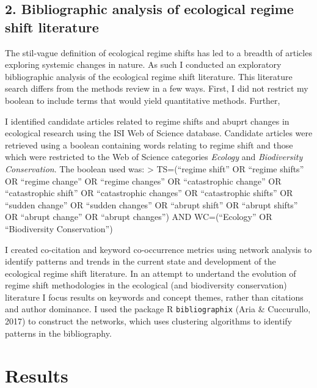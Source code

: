 \documentclass[12pt,twoside,openany]{reedthesis}
\begin{document}
\hypertarget{bibliographic-analysis-of-ecological-regime-shift-literature}{%
\subsection{2. Bibliographic analysis of ecological regime shift literature}\label{bibliographic-analysis-of-ecological-regime-shift-literature}}

The stil-vague definition of ecological regime shifts has led to a breadth of articles exploring systemic changes in nature. As such I conducted an exploratory bibliographic analysis of the ecological regime shift literature. This literature search differs from the methods review in a few ways. First, I did not restrict my boolean to include terms that would yield quantitative methods. Further,

I identified candidate articles related to regime shifts and abuprt changes in ecological research using the ISI Web of Science database. Candidate articles were retrieved using a boolean containing words relating to regime shift and those which were restricted to the Web of Science categories \emph{Ecology} and \emph{Biodiversity Conservation}. The boolean used was:
\textgreater{} TS=(``regime shift'' OR ``regime shifts'' OR ``regime change'' OR ``regime changes'' OR ``catastrophic change'' OR ``catastrophic shift'' OR ``catastrophic changes'' OR ``catastrophic shifts'' OR ``sudden change'' OR ``sudden changes'' OR ``abrupt shift'' OR ``abrupt shifts'' OR ``abrupt change'' OR ``abrupt changes'') AND WC=(``Ecology'' OR ``Biodiversity Conservation'')

I created co-citation and keyword co-occurrence metrics using network analysis to identify patterns and trends in the current state and development of the ecological regime shift literature. In an attempt to undertand the evolution of regime shift methodologies in the ecological (and biodiversity conservation) literature I focus results on keywords and concept themes, rather than citations and author dominance. I used the package R \texttt{bibliographix} (Aria \& Cuccurullo, 2017) to construct the networks, which uses clustering algorithms to identify patterns in the bibliography.

\hypertarget{results}{%
\section{Results}\label{results}}
\end{document}
